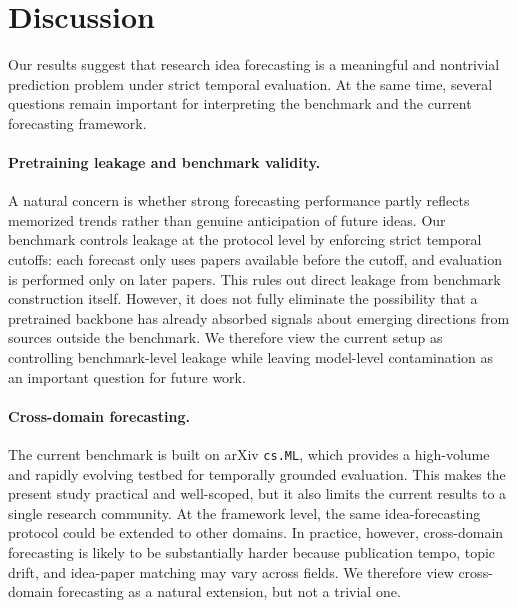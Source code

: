\documentclass{article} %
\begin{document}
\section{Discussion}





Our results suggest that research idea forecasting is a meaningful and nontrivial prediction problem under strict temporal evaluation. At the same time, several questions remain important for interpreting the benchmark and the current forecasting framework.

\paragraph{Pretraining leakage and benchmark validity.}
A natural concern is whether strong forecasting performance partly reflects memorized trends rather than genuine anticipation of future ideas. Our benchmark controls leakage at the protocol level by enforcing strict temporal cutoffs: each forecast only uses papers available before the cutoff, and evaluation is performed only on later papers. This rules out direct leakage from benchmark construction itself. However, it does not fully eliminate the possibility that a pretrained backbone has already absorbed signals about emerging directions from sources outside the benchmark. We therefore view the current setup as controlling benchmark-level leakage while leaving model-level contamination as an important question for future work.

\paragraph{Cross-domain forecasting.}
The current benchmark is built on arXiv \texttt{cs.ML}, which provides a high-volume and rapidly evolving testbed for temporally grounded evaluation. This makes the present study practical and well-scoped, but it also limits the current results to a single research community. At the framework level, the same idea-forecasting protocol could be extended to other domains. In practice, however, cross-domain forecasting is likely to be substantially harder because publication tempo, topic drift, and idea-paper matching may vary across fields. We therefore view cross-domain forecasting as a natural extension, but not a trivial one.
\end{document}
